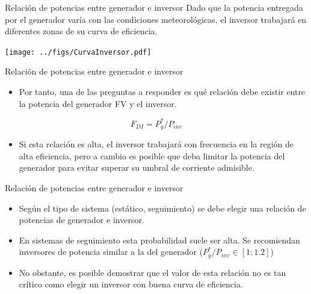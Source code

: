 \documentclass[aspectratio=169, usenames,svgnames,dvipsnames]{beamer}
\begin{document}
\begin{frame}[label={sec:org439bb26}]{Relación de potencias entre generador e inversor}
Dado que la potencia entregada por el generador varía con las condiciones meteorológicas, el inversor trabajará en diferentes zonas de su curva de eficiencia.

\begin{center}
\texttt{[image: ../figs/CurvaInversor.pdf]}
\end{center}
\end{frame}
\begin{frame}[label={sec:orgd108377}]{Relación de potencias entre generador e inversor}
\begin{itemize}
\item Por tanto, una de las preguntas a responder es \alert{qué relación debe existir entre la potencia del generador FV y el inversor}.
\end{itemize}

\[
  F_{DI} = P_{g}^{*}/P_{inv}
\]

\begin{itemize}
\item Si esta relación es alta, el inversor trabajará con frecuencia en la región de alta eficiencia, pero a cambio es posible que deba limitar la potencia del generador para evitar superar su umbral de corriente admisible.
\end{itemize}
\end{frame}
\begin{frame}[label={sec:org8423233}]{Relación de potencias entre generador e inversor}
\vfill
\begin{itemize}
\item Según el \alert{tipo de sistema} (estático, seguimiento) se debe elegir una relación de potencias de generador e inversor.
\end{itemize}
\vfill
\begin{itemize}
\item En \alert{sistemas de seguimiento} esta probabilidad suele ser alta. Se recomiendan inversores de potencia similar a la del generador  (\(P_{g}^{*}/P_{inv}\in\left[1;1.2\right]\))
\end{itemize}
\vfill
\begin{itemize}
\item No obstante, es posible demostrar que el valor de esta relación no es tan crítico como \alert{elegir un inversor con buena curva de eficiencia}.
\end{itemize}
\end{frame}
\end{document}
